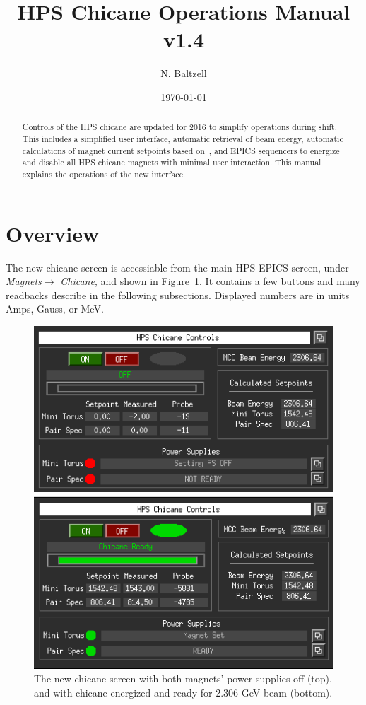 \documentclass[amsmath,amssymb,notitlepage,11pt]{revtex4-1}
\begin{document}
\title{HPS Chicane Operations Manual v1.4}
\author{N. Baltzell}
\date{\today}
\begin{abstract}
    Controls of the HPS chicane are updated for 2016 to simplify operations during shift.  This includes a simplified user interface, automatic retrieval of beam energy, automatic calculations of magnet current setpoints based on~\cite{chicaneSettings}, and EPICS sequencers to energize and disable all HPS chicane magnets with minimal user interaction.  This manual explains the operations of the new interface. 
\end{abstract}

\maketitle
\tableofcontents
\newpage

\section{Overview}
The new chicane screen is accessiable from the main HPS-EPICS screen, under {\em Magnets}$ \to$ {\em Chicane}, and shown in Figure~\ref{fig:guiChicaneOff}.  It contains a few buttons and many readbacks describe in the following subsections.  Displayed numbers are in units Amps, Gauss, or MeV. 
\begin{figure}[htbp]
    \centering\includegraphics[width=12cm]{pics/guiOFF}
    
    \centering\includegraphics[width=12cm]{pics/guiON}
    \caption{The new chicane screen with both magnets' power supplies off (top), and with chicane energized and ready for 2.306 GeV beam (bottom).\label{fig:guiChicaneOff}}
\end{figure}
\end{document}
